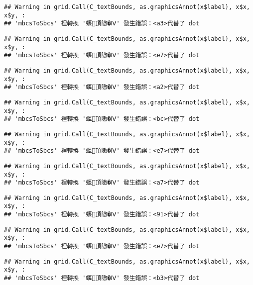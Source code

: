 \documentclass[
]{article}
\begin{document}
\begin{verbatim}
## Warning in grid.Call(C_textBounds, as.graphicsAnnot(x$label), x$x, x$y, :
## 'mbcsToSbcs' 裡轉換 '蝘頂隞�Ⅳ' 發生錯誤：<a3>代替了 dot
\end{verbatim}

\begin{verbatim}
## Warning in grid.Call(C_textBounds, as.graphicsAnnot(x$label), x$x, x$y, :
## 'mbcsToSbcs' 裡轉換 '蝘頂隞�Ⅳ' 發生錯誤：<e7>代替了 dot
\end{verbatim}

\begin{verbatim}
## Warning in grid.Call(C_textBounds, as.graphicsAnnot(x$label), x$x, x$y, :
## 'mbcsToSbcs' 裡轉換 '蝘頂隞�Ⅳ' 發生錯誤：<a2>代替了 dot
\end{verbatim}

\begin{verbatim}
## Warning in grid.Call(C_textBounds, as.graphicsAnnot(x$label), x$x, x$y, :
## 'mbcsToSbcs' 裡轉換 '蝘頂隞�Ⅳ' 發生錯誤：<bc>代替了 dot
\end{verbatim}

\begin{verbatim}
## Warning in grid.Call(C_textBounds, as.graphicsAnnot(x$label), x$x, x$y, :
## 'mbcsToSbcs' 裡轉換 '蝘頂隞�Ⅳ' 發生錯誤：<e7>代替了 dot
\end{verbatim}

\begin{verbatim}
## Warning in grid.Call(C_textBounds, as.graphicsAnnot(x$label), x$x, x$y, :
## 'mbcsToSbcs' 裡轉換 '蝘頂隞�Ⅳ' 發生錯誤：<a7>代替了 dot
\end{verbatim}

\begin{verbatim}
## Warning in grid.Call(C_textBounds, as.graphicsAnnot(x$label), x$x, x$y, :
## 'mbcsToSbcs' 裡轉換 '蝘頂隞�Ⅳ' 發生錯誤：<91>代替了 dot
\end{verbatim}

\begin{verbatim}
## Warning in grid.Call(C_textBounds, as.graphicsAnnot(x$label), x$x, x$y, :
## 'mbcsToSbcs' 裡轉換 '蝘頂隞�Ⅳ' 發生錯誤：<e7>代替了 dot
\end{verbatim}

\begin{verbatim}
## Warning in grid.Call(C_textBounds, as.graphicsAnnot(x$label), x$x, x$y, :
## 'mbcsToSbcs' 裡轉換 '蝘頂隞�Ⅳ' 發生錯誤：<b3>代替了 dot
\end{verbatim}
\end{document}
